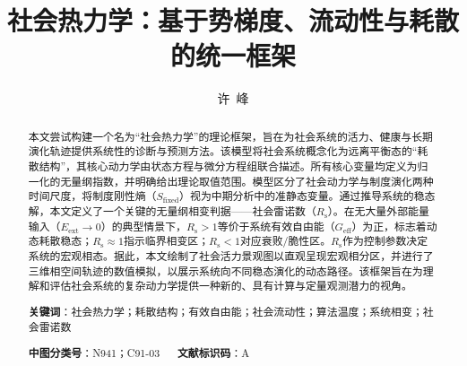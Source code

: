 \documentclass[twocolumn]{ctexart}
\title{\textbf{社会热力学：基于势梯度、流动性与耗散的统一框架}}
\author{许~峰}
\date{}
\newcommand{\Sfix}{S_{\mathrm{fixed}}}
\newcommand{\Geff}{G_{\mathrm{eff}}}
\newcommand{\Eext}{E_{\mathrm{ext}}}
\newcommand{\Rs}{R_{\mathrm{s}}}
\begin{document}
\maketitle

\begin{abstract}
本文尝试构建一个名为“社会热力学”的理论框架，旨在为社会系统的活力、健康与长期演化轨迹提供系统性的诊断与预测方法。该模型将社会系统概念化为远离平衡态的“耗散结构”，其核心动力学由状态方程与微分方程组联合描述。所有核心变量均定义为归一化的无量纲指数，并明确给出理论取值范围。模型区分了社会动力学与制度演化两种时间尺度，将制度刚性熵（$\Sfix$）视为中期分析中的准静态变量。通过推导系统的稳态解，本文定义了一个关键的无量纲相变判据——社会雷诺数（$\Rs$）。在无大量外部能量输入（$\Eext\to0$）的典型情景下，$\Rs>1$等价于系统有效自由能（$\Geff$）为正，标志着动态耗散稳态；$\Rs\approx1$指示临界相变区；$\Rs<1$对应衰败/脆性区。$\Rs$作为控制参数决定系统的宏观相态。据此，本文绘制了社会活力景观图以直观呈现宏观相分区，并进行了三维相空间轨迹的数值模拟，以展示系统向不同稳态演化的动态路径。该框架旨在为理解和评估社会系统的复杂动力学提供一种新的、具有计算与定量观测潜力的视角。

\noindent\textbf{关键词}：社会热力学；耗散结构；有效自由能；社会流动性；算法温度；系统相变；社会雷诺数

\noindent\textbf{中图分类号}：N941；C91-03 ~~ \textbf{文献标识码}：A
\end{abstract}
\end{document}
